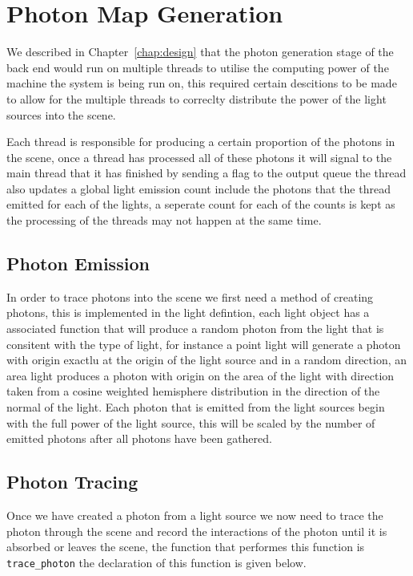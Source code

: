 \section{Photon Map Generation}
We described in Chapter~\ref{chap:design} that the photon generation stage of the back end would run on multiple threads
to utilise the computing power of the machine the system is being run on, this required certain descitions to be made to
allow for the multiple threads to correclty distribute the power of the light sources into the scene.

Each thread is responsible for producing a certain proportion of the photons in the scene, once a thread has processed all
of these photons it will signal to the main thread that it has finished by sending a flag to the output queue the thread also
updates a global light emission count include the photons that the thread emitted for each of the lights, a seperate count for
each of the counts is kept as the processing of the threads may not happen at the same time.

\subsection{Photon Emission}
In order to trace photons into the scene we first need a method of creating photons, this is implemented in the light 
defintion, each light object has a associated function that will produce a random photon from the light that is consitent with 
the type of light, for instance a point light will generate a photon with origin exactlu at the origin of the light source and
in a random direction, an area light produces a photon with origin on the area of the light with direction taken from a
cosine weighted hemisphere distribution in the direction of the normal of the light. Each photon that is emitted from the
light sources begin with the full power of the light source, this will be scaled by the number of emitted photons after
all photons have been gathered.

\subsection{Photon Tracing}
Once we have created a photon from a light source we now need to trace the photon through the scene and record the interactions
of the photon until it is absorbed or leaves the scene, the function that performes this function is \texttt{trace\_photon} the
declaration of this function is given below.

